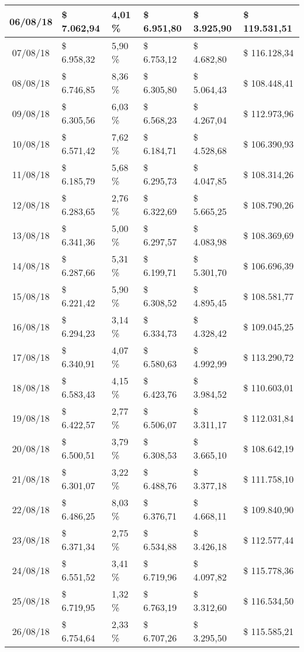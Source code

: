 \begin{small}
\begin{longtable}{|c|l|l|l|l|l|}
06/08/18 & \$ 7.062,94 & 4,01 \% & \$ 6.951,80 & \$ 3.925,90 & \$ 119.531,51 \\ \hline
07/08/18 & \$ 6.958,32 & 5,90 \% & \$ 6.753,12 & \$ 4.682,80 & \$ 116.128,34 \\ \hline
08/08/18 & \$ 6.746,85 & 8,36 \% & \$ 6.305,80 & \$ 5.064,43 & \$ 108.448,41 \\ \hline
09/08/18 & \$ 6.305,56 & 6,03 \% & \$ 6.568,23 & \$ 4.267,04 & \$ 112.973,96 \\ \hline
10/08/18 & \$ 6.571,42 & 7,62 \% & \$ 6.184,71 & \$ 4.528,68 & \$ 106.390,93 \\ \hline
11/08/18 & \$ 6.185,79 & 5,68 \% & \$ 6.295,73 & \$ 4.047,85 & \$ 108.314,26 \\ \hline
12/08/18 & \$ 6.283,65 & 2,76 \% & \$ 6.322,69 & \$ 5.665,25 & \$ 108.790,26 \\ \hline
13/08/18 & \$ 6.341,36 & 5,00 \% & \$ 6.297,57 & \$ 4.083,98 & \$ 108.369,69 \\ \hline
14/08/18 & \$ 6.287,66 & 5,31 \% & \$ 6.199,71 & \$ 5.301,70 & \$ 106.696,39 \\ \hline
15/08/18 & \$ 6.221,42 & 5,90 \% & \$ 6.308,52 & \$ 4.895,45 & \$ 108.581,77 \\ \hline
16/08/18 & \$ 6.294,23 & 3,14 \% & \$ 6.334,73 & \$ 4.328,42 & \$ 109.045,25 \\ \hline
17/08/18 & \$ 6.340,91 & 4,07 \% & \$ 6.580,63 & \$ 4.992,99 & \$ 113.290,72 \\ \hline
18/08/18 & \$ 6.583,43 & 4,15 \% & \$ 6.423,76 & \$ 3.984,52 & \$ 110.603,01 \\ \hline
19/08/18 & \$ 6.422,57 & 2,77 \% & \$ 6.506,07 & \$ 3.311,17 & \$ 112.031,84 \\ \hline
20/08/18 & \$ 6.500,51 & 3,79 \% & \$ 6.308,53 & \$ 3.665,10 & \$ 108.642,19 \\ \hline
21/08/18 & \$ 6.301,07 & 3,22 \% & \$ 6.488,76 & \$ 3.377,18 & \$ 111.758,10 \\ \hline
22/08/18 & \$ 6.486,25 & 8,03 \% & \$ 6.376,71 & \$ 4.668,11 & \$ 109.840,90 \\ \hline
23/08/18 & \$ 6.371,34 & 2,75 \% & \$ 6.534,88 & \$ 3.426,18 & \$ 112.577,44 \\ \hline
24/08/18 & \$ 6.551,52 & 3,41 \% & \$ 6.719,96 & \$ 4.097,82 & \$ 115.778,36 \\ \hline
25/08/18 & \$ 6.719,95 & 1,32 \% & \$ 6.763,19 & \$ 3.312,60 & \$ 116.534,50 \\ \hline
26/08/18 & \$ 6.754,64 & 2,33 \% & \$ 6.707,26 & \$ 3.295,50 & \$ 115.585,21 \\ \hline

\end{longtable}
\end{small}
